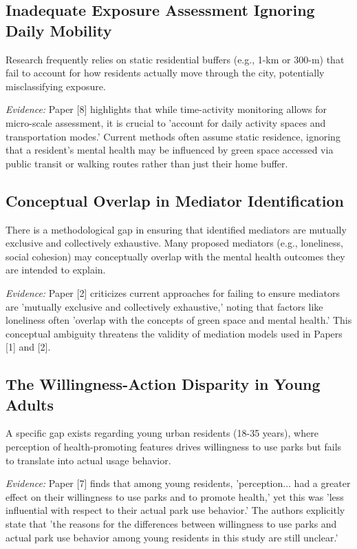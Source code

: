 \documentclass[conference]{IEEEtran}
\begin{document}
\subsection{Inadequate Exposure Assessment Ignoring Daily Mobility}
Research frequently relies on static residential buffers (e.g., 1-km or 300-m) that fail to account for how residents actually move through the city, potentially misclassifying exposure.

\textit{Evidence:} Paper [8] highlights that while time-activity monitoring allows for micro-scale assessment, it is crucial to 'account for daily activity spaces and transportation modes.' Current methods often assume static residence, ignoring that a resident's mental health may be influenced by green space accessed via public transit or walking routes rather than just their home buffer.

\subsection{Conceptual Overlap in Mediator Identification}
There is a methodological gap in ensuring that identified mediators are mutually exclusive and collectively exhaustive. Many proposed mediators (e.g., loneliness, social cohesion) may conceptually overlap with the mental health outcomes they are intended to explain.

\textit{Evidence:} Paper [2] criticizes current approaches for failing to ensure mediators are 'mutually exclusive and collectively exhaustive,' noting that factors like loneliness often 'overlap with the concepts of green space and mental health.' This conceptual ambiguity threatens the validity of mediation models used in Papers [1] and [2].

\subsection{The Willingness-Action Disparity in Young Adults}
A specific gap exists regarding young urban residents (18-35 years), where perception of health-promoting features drives willingness to use parks but fails to translate into actual usage behavior.

\textit{Evidence:} Paper [7] finds that among young residents, 'perception... had a greater effect on their willingness to use parks and to promote health,' yet this was 'less influential with respect to their actual park use behavior.' The authors explicitly state that 'the reasons for the differences between willingness to use parks and actual park use behavior among young residents in this study are still unclear.'
\end{document}
